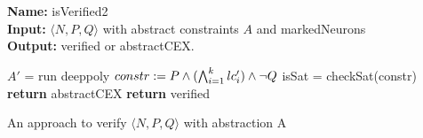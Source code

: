 \begin{algorithm}[t]
  \textbf{Name: } isVerified2 \\
  \textbf{Input: } $\langle N,P,Q \rangle$ with abstract constraints $A$ and markedNeurons \\
  \textbf{Output: } verified or  abstractCEX. 
  \begin{algorithmic}[1]
      \State $A'$ = run deeppoly
      \State $constr := P \land (\bigwedge_{i=1}^k lc'_i) \land \neg Q$ 
        \State isSat = checkSat(constr)
          \State \textbf{return} abstractCEX
        \EndIf
    \EndFor
    \State \textbf{return} verified
  \end{algorithmic}
  \caption{An approach to verify $\langle N,P,Q \rangle$ with abstraction A}
  \label{algo:verif2}
\end{algorithm}













